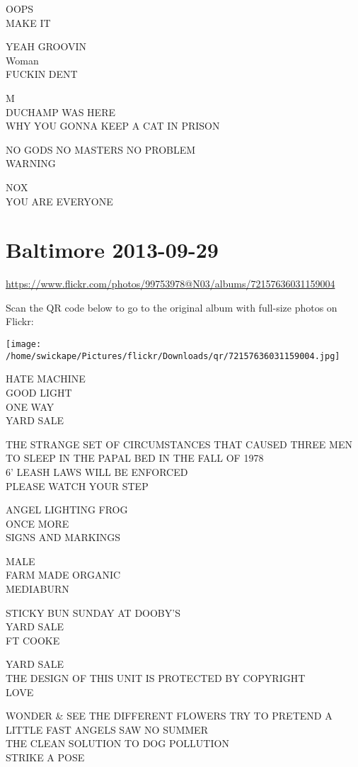 \documentclass[10pt,letterpaper]{article}
\begin{document}
OOPS\\
MAKE IT

YEAH GROOVIN\\
Woman\\
FUCKIN DENT

M\\
DUCHAMP WAS HERE\\
WHY YOU GONNA KEEP A CAT IN PRISON

NO GODS NO MASTERS NO PROBLEM\\
WARNING

NOX\\
YOU ARE EVERYONE


\section*{Baltimore 2013-09-29}

\url{https://www.flickr.com/photos/99753978@N03/albums/72157636031159004}

Scan the QR code below to go to the original album with full-size photos on Flickr:

\texttt{[image: /home/swickape/Pictures/flickr/Downloads/qr/72157636031159004.jpg]}


HATE MACHINE\\
GOOD LIGHT\\
ONE WAY\\
YARD SALE

THE STRANGE SET OF CIRCUMSTANCES THAT CAUSED THREE MEN TO SLEEP IN THE PAPAL BED IN THE FALL OF 1978\\
6' LEASH LAWS WILL BE ENFORCED\\
PLEASE WATCH YOUR STEP

ANGEL LIGHTING FROG\\
ONCE MORE\\
SIGNS AND MARKINGS

MALE\\
FARM MADE ORGANIC\\
MEDIABURN

STICKY BUN SUNDAY AT DOOBY'S\\
YARD SALE\\
FT COOKE

YARD SALE\\
THE DESIGN OF THIS UNIT IS PROTECTED BY COPYRIGHT\\
LOVE

WONDER \& SEE THE DIFFERENT FLOWERS TRY TO PRETEND A LITTLE FAST ANGELS SAW NO SUMMER\\
THE CLEAN SOLUTION TO DOG POLLUTION\\
STRIKE A POSE
\end{document}
